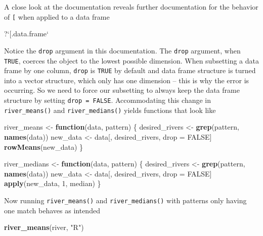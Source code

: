 \documentclass[
]{book}
\newenvironment{Shaded}{\begin{snugshade}}{\end{snugshade}}
\newcommand{\ControlFlowTok}[1]{\textcolor[rgb]{0.13,0.29,0.53}{\textbf{#1}}}
\newcommand{\DataTypeTok}[1]{\textcolor[rgb]{0.13,0.29,0.53}{#1}}
\newcommand{\DecValTok}[1]{\textcolor[rgb]{0.00,0.00,0.81}{#1}}
\newcommand{\KeywordTok}[1]{\textcolor[rgb]{0.13,0.29,0.53}{\textbf{#1}}}
\newcommand{\NormalTok}[1]{#1}
\newcommand{\OtherTok}[1]{\textcolor[rgb]{0.56,0.35,0.01}{#1}}
\newcommand{\StringTok}[1]{\textcolor[rgb]{0.31,0.60,0.02}{#1}}
\begin{document}
A close look at the documentation reveals further documentation for the behavior of \texttt{{[}} when applied to a data frame

\begin{Shaded}
\begin{Highlighting}[]
\NormalTok{?}\StringTok{`}\DataTypeTok{[.data.frame}\StringTok{`}
\end{Highlighting}
\end{Shaded}

Notice the \texttt{drop} argument in this documentation. The \texttt{drop} argument, when \texttt{TRUE}, coerces the object to the lowest possible dimension. When subsetting a data frame by one column, \texttt{drop} is \texttt{TRUE} by default and data frame structure is turned into a vector structure, which only has one dimension -- this is why the error is occurring. So we need to force our subsetting to always keep the data frame structure by setting \texttt{drop\ =\ FALSE}. Accommodating this change in \texttt{river\_means()} and \texttt{river\_medians()} yields functions that look like

\begin{Shaded}
\begin{Highlighting}[]
\NormalTok{river_means <-}\StringTok{ }\ControlFlowTok{function}\NormalTok{(data, pattern) \{}
\NormalTok{  desired_rivers <-}\StringTok{ }\KeywordTok{grep}\NormalTok{(pattern, }\KeywordTok{names}\NormalTok{(data))}
\NormalTok{  new_data <-}\StringTok{ }\NormalTok{data[, desired_rivers, drop =}\StringTok{ }\OtherTok{FALSE}\NormalTok{]}
  \KeywordTok{rowMeans}\NormalTok{(new_data)}
\NormalTok{\}}

\NormalTok{river_medians <-}\StringTok{ }\ControlFlowTok{function}\NormalTok{(data, pattern) \{}
\NormalTok{  desired_rivers <-}\StringTok{ }\KeywordTok{grep}\NormalTok{(pattern, }\KeywordTok{names}\NormalTok{(data))}
\NormalTok{  new_data <-}\StringTok{ }\NormalTok{data[, desired_rivers, drop =}\StringTok{ }\OtherTok{FALSE}\NormalTok{]}
  \KeywordTok{apply}\NormalTok{(new_data, }\DecValTok{1}\NormalTok{, median)}
\NormalTok{\}}
\end{Highlighting}
\end{Shaded}

Now running \texttt{river\_means()} and \texttt{river\_medians()} with patterns only having one match behaves as intended

\begin{Shaded}
\begin{Highlighting}[]
\KeywordTok{river_means}\NormalTok{(river, }\StringTok{"R"}\NormalTok{)}
\end{Highlighting}
\end{Shaded}
\end{document}

